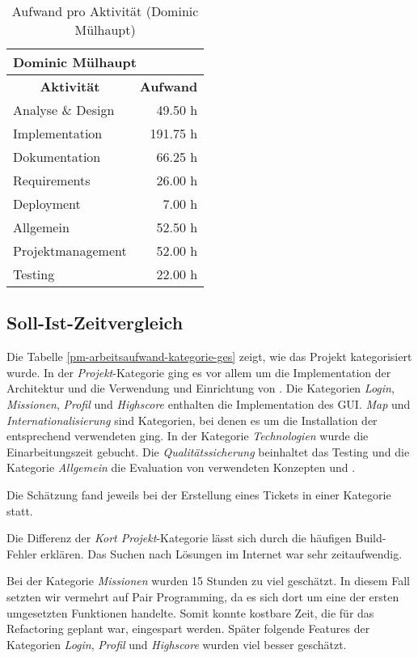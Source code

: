 \begin{table}[H]
\centering
\begin{tabular}{|l|r|}
\hline
\multicolumn{2}{|l|}{\textbf{Dominic Mülhaupt}} \\
\hline
\multicolumn{1}{|c|}{\textbf{Aktivität}} & \multicolumn{1}{|c|}{\textbf{Aufwand}} \\
\hline
Analyse \& Design & 49.50 h \\
\hline
Implementation & 191.75 h \\
\hline
Dokumentation & 66.25 h \\
\hline
Requirements & 26.00 h \\
\hline
Deployment & 7.00 h \\
\hline
Allgemein & 52.50 h \\
\hline
Projektmanagement & 52.00 h \\
\hline
Testing & 22.00 h \\
\hline
\end{tabular}
\caption{Aufwand pro Aktivität (Dominic Mülhaupt)}\label{pm-arbeitsaufwand-aktivität-dm}
\end{table}


\subsection{Soll-Ist-Zeitvergleich}
Die Tabelle \ref{pm-arbeitsaufwand-kategorie-ges} zeigt, wie das Projekt kategorisiert wurde. 
In der \kort{} \textit{Projekt}-Kategorie ging es vor allem um die Implementation der Architektur und die Verwendung und Einrichtung von . 
Die Kategorien \textit{Login}, \textit{Missionen}, \textit{Profil} und \textit{Highscore} enthalten die Implementation des \gls{GUI}. 
\textit{Map} und \textit{Internationalisierung} sind Kategorien, bei denen es um die Installation der entsprechend verwendeten  ging. 
In der Kategorie \textit{Technologien} wurde die Einarbeitungszeit gebucht. 
Die \textit{Qualitätssicherung} beinhaltet das Testing und die Kategorie \textit{Allgemein} die Evaluation von verwendeten Konzepten und .

Die Schätzung fand jeweils bei der Erstellung eines Tickets in einer Kategorie statt. 

Die Differenz der \textit{Kort Projekt}-Kategorie lässt sich durch die häufigen Build-Fehler erklären. 
Das Suchen nach Lösungen im Internet war sehr zeitaufwendig. 

Bei der Kategorie \textit{Missionen} wurden 15 Stunden zu viel geschätzt. 
In diesem Fall setzten wir vermehrt auf \gls{Pair Programming}, da es sich dort um eine der ersten umgesetzten Funktionen handelte.
Somit konnte kostbare Zeit, die für das Refactoring geplant war, eingespart werden. 
Später folgende Features der Kategorien \textit{Login}, \textit{Profil} und \textit{Highscore} wurden viel besser geschätzt.

